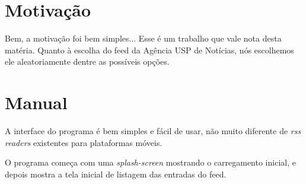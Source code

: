 




\cabecalho

\section{Motivação}
Bem, a motivação foi bem simples... Esse é um trabalho que vale nota desta matéria.
Quanto à escolha do feed da Agência USP de Notícias, nós escolhemos ele aleatoriamente
dentre as possíveis opções.


\section{Manual}
A interface do programa é bem simples e fácil de usar, não muito diferente de \textit{rss readers}
existentes para plataformas móveis.

O programa começa com uma \textit{splash-screen} mostrando o carregamento inicial, e depois
mostra a tela inicial de listagem das entradas do feed.

